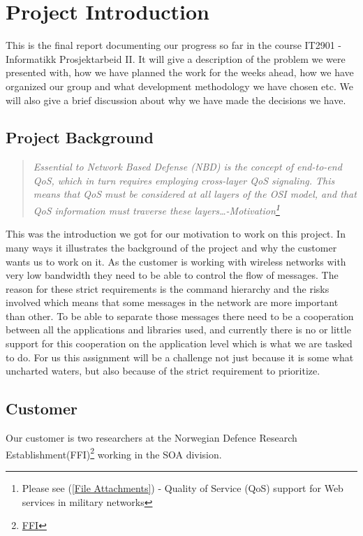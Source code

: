 \section{Project Introduction}\label{Project Introduction}
    This is the final report documenting our progress so far in the course IT2901 - Informatikk Prosjektarbeid II. It will give a description of the problem we were presented with, how we have planned the work for the weeks ahead, how we have organized our group and what development methodology we have chosen etc. We will also give a brief discussion about why we have made the decisions we have.
    
    \subsection{Project Background}\label{Project Background}
    \begin{quotation}
    \em Essential to Network Based Defense (NBD) is the concept of end-to-end QoS, which in turn requires employing cross-layer QoS signaling. This means that QoS must be considered at all layers of the OSI model, and that QoS information must traverse these layers\ldots -Motivation\footnote{Please see (\ref{File Attachments}) - Quality of Service (QoS) support for Web services in military networks}
    \end{quotation}
    This was the introduction we got for our motivation to work on this project. In many ways it illustrates the background of the project and why the customer wants us to work on it. As the customer is working with wireless networks with very low bandwidth they need to be able to control the flow of messages. The reason for these strict requirements is the command hierarchy and the risks involved which means that some messages in the network are more important than other. To be able to separate those messages there need to be a cooperation between all the applications and libraries used, and currently there is no or little support for this cooperation on the application level which is what we are tasked to do. For us this assignment will be a challenge not just because it is some what uncharted waters, but also because of the strict requirement to prioritize.

    \subsection{Customer}\label{Customer}
    Our customer is two researchers at the Norwegian Defence Research Establishment(FFI)\footnote{\href{http://www.ffi.no/no/Sider/default.aspx}{FFI}} working in the SOA division.
